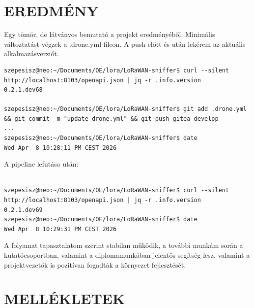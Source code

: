 \clearpage
\section{EREDMÉNY}

Egy tömör, de látványos bemutató a projekt eredményéből. Minimális változtatást végzek a .drone.yml fileon. A push előtt és után lekérem az aktuális alkalmazásverziót. 

\begin{lstlisting}
szepesisz@neo:~/Documents/OE/lora/LoRaWAN-sniffer$ curl --silent http://localhost:8103/openapi.json | jq -r .info.version
0.2.1.dev68

szepesisz@neo:~/Documents/OE/lora/LoRaWAN-sniffer$ git add .drone.yml && git commit -m "update drone.yml" && git push gitea develop
...
szepesisz@neo:~/Documents/OE/lora/LoRaWAN-sniffer$ date
Wed Apr  8 10:28:11 PM CEST 2026

\end{lstlisting}

A pipeline lefutása után:

\begin{lstlisting}

szepesisz@neo:~/Documents/OE/lora/LoRaWAN-sniffer$ curl --silent http://localhost:8103/openapi.json | jq -r .info.version
0.2.1.dev69
szepesisz@neo:~/Documents/OE/lora/LoRaWAN-sniffer$ date
Wed Apr  8 10:29:31 PM CEST 2026

\end{lstlisting}

A folyamat tapasztalatom szerint stabilan működik, a további munkám során a kutatócsoportban, valamint a diplomamunkában jelentős segítség lesz, valamint a projektvezetők is pozitívan fogadták a környezet fejlesztését.

\clearpage
\section{MELLÉKLETEK}





\clearpage
\renewcommand{\listfigurename}{ÁBRAJEGYZÉK}
\listoffigures

\clearpage



